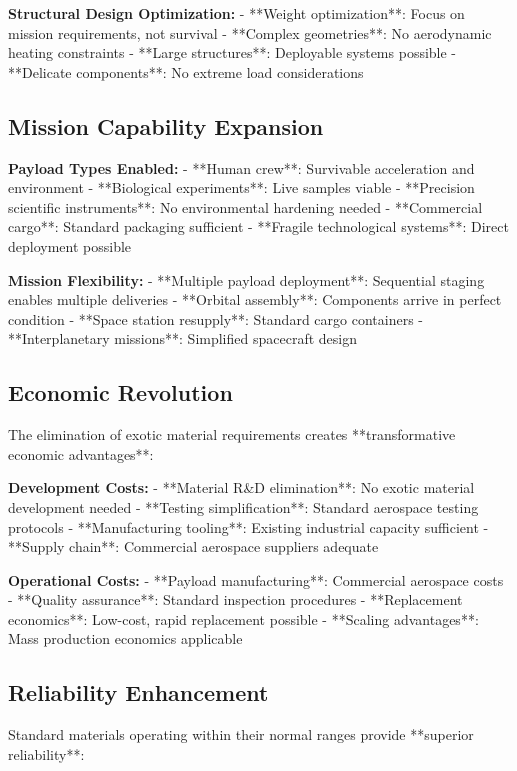 \documentclass[12pt,a4paper]{article}
\begin{document}
\textbf{Structural Design Optimization:}
- **Weight optimization**: Focus on mission requirements, not survival
- **Complex geometries**: No aerodynamic heating constraints
- **Large structures**: Deployable systems possible
- **Delicate components**: No extreme load considerations

\subsection{Mission Capability Expansion}

\textbf{Payload Types Enabled:}
- **Human crew**: Survivable acceleration and environment
- **Biological experiments**: Live samples viable
- **Precision scientific instruments**: No environmental hardening needed
- **Commercial cargo**: Standard packaging sufficient
- **Fragile technological systems**: Direct deployment possible

\textbf{Mission Flexibility:}
- **Multiple payload deployment**: Sequential staging enables multiple deliveries
- **Orbital assembly**: Components arrive in perfect condition
- **Space station resupply**: Standard cargo containers
- **Interplanetary missions**: Simplified spacecraft design

\subsection{Economic Revolution}

The elimination of exotic material requirements creates **transformative economic advantages**:

\textbf{Development Costs:}
- **Material R&D elimination**: No exotic material development needed
- **Testing simplification**: Standard aerospace testing protocols
- **Manufacturing tooling**: Existing industrial capacity sufficient
- **Supply chain**: Commercial aerospace suppliers adequate

\textbf{Operational Costs:}
- **Payload manufacturing**: Commercial aerospace costs
- **Quality assurance**: Standard inspection procedures
- **Replacement economics**: Low-cost, rapid replacement possible
- **Scaling advantages**: Mass production economics applicable

\subsection{Reliability Enhancement}

Standard materials operating within their normal ranges provide **superior reliability**:
\end{document}
